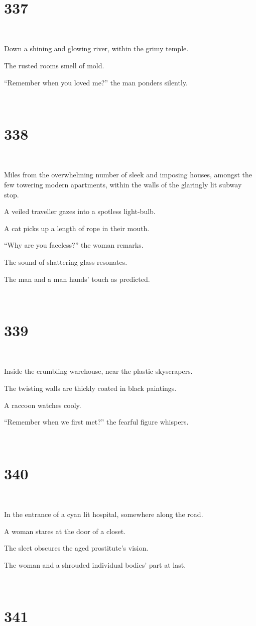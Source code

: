 \documentclass{report}
\begin{document}
~
\chapter*{337}
~

Down a shining and glowing river, within the grimy temple.

The rusted rooms smell of mold.

``Remember when you loved me?'' the man ponders silently.

~
\chapter*{338}
~

Miles from the overwhelming number of sleek and imposing houses, amongst the few towering modern apartments, within the walls of the glaringly lit subway stop.

A veiled traveller gazes into a spotless light-bulb.

A cat picks up a length of rope in their mouth.

``Why are you faceless?'' the woman remarks.

The sound of shattering glass resonates.

The man and a man hands' touch as predicted.

~
\chapter*{339}
~

Inside the crumbling warehouse, near the plastic skyscrapers.

The twisting walls are thickly coated in black paintings.

A raccoon watches cooly.

``Remember when we first met?'' the fearful figure whispers.

~
\chapter*{340}
~

In the entrance of a cyan lit hospital, somewhere along the road.

A woman stares at the door of a closet.

The sleet obscures the aged prostitute's vision.

The woman and a shrouded individual bodies' part at last.

~
\chapter*{341}
~
\end{document}
